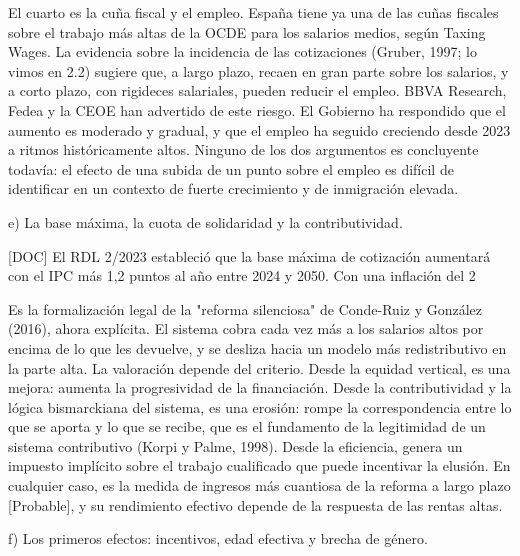\documentclass[10pt,a4paper]{article}
\begin{document}
El cuarto es la cuña fiscal y el empleo. España tiene ya una de las cuñas fiscales sobre el trabajo más altas de la OCDE para los salarios medios, según Taxing Wages. La evidencia sobre la incidencia de las cotizaciones (Gruber, 1997; lo vimos en 2.2) sugiere que, a largo plazo, recaen en gran parte sobre los salarios, y a corto plazo, con rigideces salariales, pueden reducir el empleo. BBVA Research, Fedea y la CEOE han advertido de este riesgo. El Gobierno ha respondido que el aumento es moderado y gradual, y que el empleo ha seguido creciendo desde 2023 a ritmos históricamente altos. Ninguno de los dos argumentos es concluyente todavía: el efecto de una subida de un punto sobre el empleo es difícil de identificar en un contexto de fuerte crecimiento y de inmigración elevada.

e) La base máxima, la cuota de solidaridad y la contributividad.

[DOC] El RDL 2/2023 estableció que la base máxima de cotización aumentará con el IPC más 1,2 puntos al año entre 2024 y 2050. Con una inflación del 2%

Es la formalización legal de la "reforma silenciosa" de Conde-Ruiz y González (2016), ahora explícita. El sistema cobra cada vez más a los salarios altos por encima de lo que les devuelve, y se desliza hacia un modelo más redistributivo en la parte alta. La valoración depende del criterio. Desde la equidad vertical, es una mejora: aumenta la progresividad de la financiación. Desde la contributividad y la lógica bismarckiana del sistema, es una erosión: rompe la correspondencia entre lo que se aporta y lo que se recibe, que es el fundamento de la legitimidad de un sistema contributivo (Korpi y Palme, 1998). Desde la eficiencia, genera un impuesto implícito sobre el trabajo cualificado que puede incentivar la elusión. En cualquier caso, es la medida de ingresos más cuantiosa de la reforma a largo plazo [Probable], y su rendimiento efectivo depende de la respuesta de las rentas altas.

f) Los primeros efectos: incentivos, edad efectiva y brecha de género.
\end{document}
